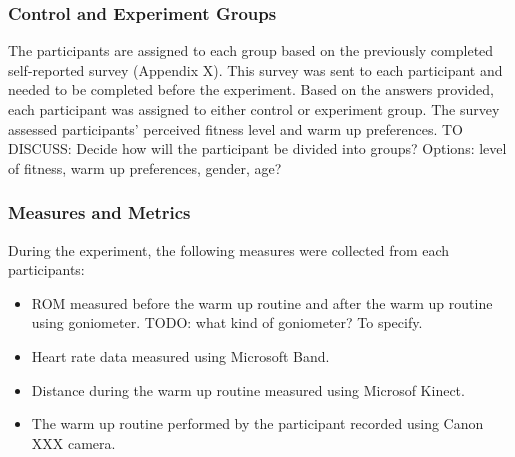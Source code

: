 \subsubsection{Control and Experiment Groups}
The participants are assigned to each group based on the previously completed self-reported survey (Appendix X). This survey was sent to each participant and needed to be completed before the experiment. Based on the answers provided, each participant was assigned to either control or experiment group. The survey assessed participants' perceived fitness level and warm up preferences. TO DISCUSS: Decide how will the participant be divided into groups? Options: level of fitness, warm up preferences, gender, age?
\subsubsection{Measures and Metrics}
During the experiment, the following measures were collected from each participants:
\begin{itemize}
\item ROM measured before the warm up routine and after the warm up routine using goniometer. TODO: what kind of goniometer? To specify.
\item Heart rate data measured using Microsoft Band.
\item Distance during the warm up routine measured using Microsof Kinect. 
\item The warm up routine performed by the participant recorded using Canon XXX camera.
\end{itemize}

